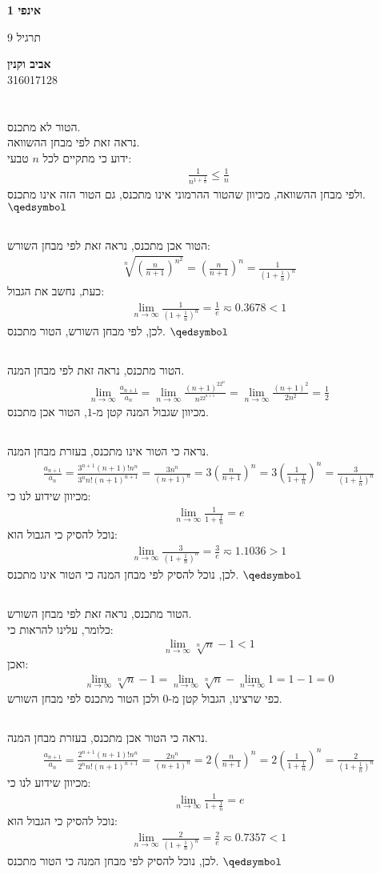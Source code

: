 \documentclass[a4paper, 12pt, leqno]{article}
\newcommand{\sub}[1]{\subsection{\underline{#1}}}
\newcommand{\eq}[1]{\begin{align*}#1\end{align*}}
\newcommand{\limn}{\lim_{n\to\infty}}
\renewcommand{\qed}{\hfill\(\qedsymbol\)}
\renewcommand{\leq}{\leqslant}
\begin{document}
\begin{titlepage}
    \begin{center}
        \vspace*{4cm}
    
        {\fontsize{32pt}{32pt}\selectfont \textbf{אינפי 1}}
        
        \vspace{0.4cm}
        
        {\LARGE
        תרגיל 9}
    
        \vfill
            
        {
            \Large\textbf{אביב וקנין}
            \\
            316017128
        }
    \end{center}
\end{titlepage}

\section{}
\sub{}
הטור לא מתכנס.\\
נראה זאת לפי מבחן ההשוואה.\\
ידוע כי מתקיים לכל $n$ טבעי:
\eq{
    \frac{1}{n^{1+\frac{1}{n}}}\leq\frac{1}{n}
}
ולפי מבחן ההשוואה, מכיוון שהטור ההרמוני אינו מתכנס, גם הטור הזה אינו מתכנס.
\qed
\sub{}
הטור אכן מתכנס, נראה זאת לפי מבחן השורש:
\eq{
    \sqrt[n]{(\frac{n}{n+1})^{n^2}}=(\frac{n}{n+1})^n=\frac{1}{(1+\frac{1}{n})^n}
}
כעת, נחשב את הגבול:
\eq{
    \limn\frac{1}{(1+\frac{1}{n})^n}=\frac{1}{e}\eqsim0.3678<1
}
לכן, לפי מבחן השורש, הטור מתכנס.
\qed
\setcounter{subsection}{3}
\sub{}
הטור מתכנס, נראה זאת לפי מבחן המנה.
\eq{
    \limn{\frac{a_{n+1}}{a_n}}=\limn{\frac{(n+1)^22^n}{n^22^{n+1}}}=\limn\frac{(n+1)^2}{2n^2}=\frac{1}{2}
}
מכיוון שגבול המנה קטן מ-$1$, הטור אכן מתכנס.
\sub{}
נראה כי הטור אינו מתכנס, בעזרת מבחן המנה.
\eq{
    \frac{a_{n+1}}{a_n}=\frac{3^{n+1}(n+1)!n^n}{3^nn!(n+1)^{n+1}}=\frac{3n^n}{(n+1)^n}=3(\frac{n}{n+1})^n=3(\frac{1}{1+\frac{1}{n}})^n=\frac{3}{(1+\frac{1}{n})^n}
}
מכיוון שידוע לנו כי:
\eq{
    \limn\frac{1}{1+\frac{1}{n}}=e
}
נוכל להסיק כי הגבול הוא:
\eq{
    \limn\frac{3}{(1+\frac{1}{n})^n}=\frac{3}{e}\eqsim1.1036>1
}
לכן, נוכל להסיק לפי מבחן המנה כי הטור אינו מתכנס.
\qed
\setcounter{subsection}{6}
\sub{}
הטור מתכנס, נראה זאת לפי מבחן השורש.\\
כלומר, עלינו להראות כי:
\eq{
    \limn{\sqrt[n]{n}-1}<1
}
ואכן:
\eq{
    \limn{\sqrt[n]{n}-1}=\limn\sqrt[n]{n}-\limn1=1-1=0
}
כפי שרצינו, הגבול קטן מ-$0$ ולכן הטור מתכנס לפי מבחן השורש.
\sub{}
נראה כי הטור אכן מתכנס, בעזרת מבחן המנה.
\eq{
    \frac{a_{n+1}}{a_n}=\frac{2^{n+1}(n+1)!n^n}{2^nn!(n+1)^{n+1}}=\frac{2n^n}{(n+1)^n}=2(\frac{n}{n+1})^n=2(\frac{1}{1+\frac{1}{n}})^n=\frac{2}{(1+\frac{1}{n})^n}
}
מכיוון שידוע לנו כי:
\eq{
    \limn\frac{1}{1+\frac{1}{n}}=e
}
נוכל להסיק כי הגבול הוא:
\eq{
    \limn\frac{2}{(1+\frac{1}{n})^n}=\frac{2}{e}\eqsim0.7357<1
}
לכן, נוכל להסיק לפי מבחן המנה כי הטור מתכנס.
\qed
\pagebreak
\end{document}
